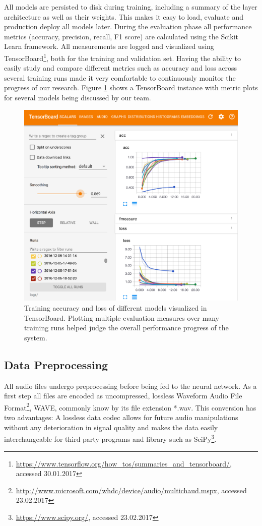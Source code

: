 	All models are persisted to disk during training, including a summary of the layer architecture as well as their weights. This makes it easy to load, evaluate and production deploy all models later. During the evaluation phase all performance metrics (accuracy, precision, recall, F1 score) are calculated using the Scikit Learn\cite{scikit-learn} framework. All measurements are logged and visualized using TensorBoard\footnote{\url{https://www.tensorflow.org/how_tos/summaries_and_tensorboard/}, accessed 30.01.2017}, both for the training and validation set. Having the ability to easily study and compare different metrics such as accuracy and loss across several training runs made it very comfortable to continuously monitor the progress of our research. Figure \ref{fig:tensorboard} shows a TensorBoard instance with metric plots for several models being discussed by our team.
	\begin{figure}[]
  		\centering
    	\includegraphics[width=\textwidth,keepaspectratio]{img/tensorboard.png}
    	\caption{Training accuracy and loss of different models visualized in TensorBoard. Plotting multiple evaluation measures over many training runs helped judge the overall performance progress of the system.}
    	\label{fig:tensorboard}
	\end{figure}		
	
\subsection{Data Preprocessing}
\label{sec:data_processing}
All audio files undergo preprocessing before being fed to the neural network. As a first step all files are encoded as uncompressed, lossless Waveform Audio File Format\footnote{\url{http://www.microsoft.com/whdc/device/audio/multichaud.mspx}, accessed 23.02.2017}, WAVE, commonly know by its file extension *.wav. This conversion has two advantages: A lossless data codec allows for future audio manipulations without any deterioration in signal quality and makes the data easily interchangeable for third party programs and library such as SciPy\footnote{\url{https://www.scipy.org/}, accessed 23.02.2017}. 

